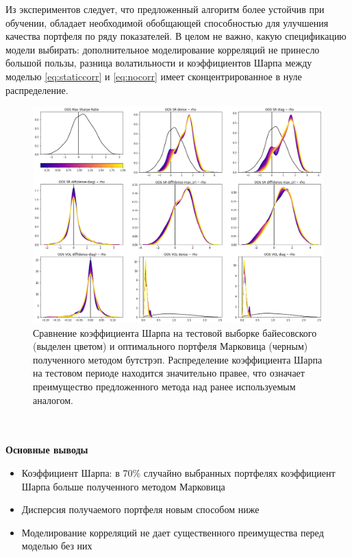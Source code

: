Из экспериментов следует, что предложенный алгоритм более устойчив при обучении, обладает необходимой обобщающей способностью для улучшения качества портфеля по ряду показателей. В целом не важно, какую спецификацию модели выбирать: дополнительное моделирование корреляций не принесло большой пользы, разница волатильности и коэффициентов Шарпа между моделью \eqref{eq:staticcorr} и \eqref{eq:nocorr} имеет сконцентрированное в нуле распределение.
\begin{figure}[h]
	\centering
	\includegraphics[width=\linewidth]{Thesis/images/performance}
	\caption{Сравнение коэффициента Шарпа на тестовой выборке байесовского (выделен цветом) и оптимального портфеля Марковица (черным) полученного методом бутстрэп. Распределение коэффициента Шарпа на тестовом периоде находится значительно правее, что означает преимущество предложенного метода над ранее используемым аналогом. }
	\label{fig:performance}
\end{figure}
\\\\
\textbf{Основные выводы}
\begin{itemize}
	\item Коэффициент Шарпа: в 70\% случайно выбранных портфелях коэффициент Шарпа больше полученного методом Марковица
	\item Дисперсия получаемого портфеля новым способом ниже
	\item Моделирование корреляций не дает существенного преимущества перед моделью без них
\end{itemize}

